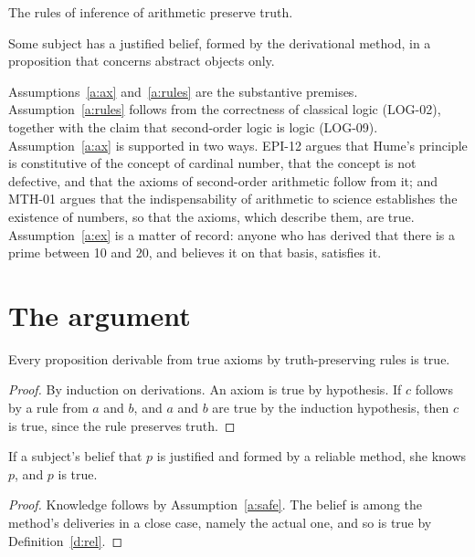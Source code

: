 \documentclass{situationist-preprint}
\begin{document}
\begin{assumption}[Rules]\label{a:rules}
The rules of inference of arithmetic preserve truth.
\end{assumption}

\begin{assumption}[Exercise]\label{a:ex}
Some subject has a justified belief, formed by the derivational method, in a proposition that concerns abstract objects only.
\end{assumption}

Assumptions~\ref{a:ax} and~\ref{a:rules} are the substantive premises. Assumption~\ref{a:rules} follows from the correctness of classical logic (LOG-02), together with the claim that second-order logic is logic (LOG-09). Assumption~\ref{a:ax} is supported in two ways. EPI-12 argues that Hume's principle is constitutive of the concept of cardinal number, that the concept is not defective, and that the axioms of second-order arithmetic follow from it; and MTH-01 argues that the indispensability of arithmetic to science establishes the existence of numbers, so that the axioms, which describe them, are true. Assumption~\ref{a:ex} is a matter of record: anyone who has derived that there is a prime between 10 and 20, and believes it on that basis, satisfies it.

\section{The argument}

\begin{lemma}\label{l:deriv}
Every proposition derivable from true axioms by truth-preserving rules is true.
\end{lemma}

\begin{proof}
By induction on derivations. An axiom is true by hypothesis. If $c$ follows by a rule from $a$ and $b$, and $a$ and $b$ are true by the induction hypothesis, then $c$ is true, since the rule preserves truth.
\end{proof}

\begin{theorem}\label{t:rel}
If a subject's belief that $p$ is justified and formed by a reliable method, she knows $p$, and $p$ is true.
\end{theorem}

\begin{proof}
Knowledge follows by Assumption~\ref{a:safe}. The belief is among the method's deliveries in a close case, namely the actual one, and so is true by Definition~\ref{d:rel}.
\end{proof}
\end{document}

